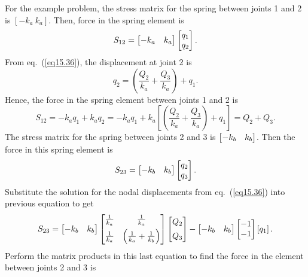 \documentclass{AeroStructure-ERJohnson}
\begin{document}
For the example problem, the stress matrix for the spring between joints 1 and 2 is $\left[-k_{a}\ k_{a}\right]$. Then, force in the spring element is
\[
S_{12}=\left[\begin{array}{@{}ll@{}}-k_{a} & k_{a}\end{array}\right]\left[\begin{array}{@{}l@{}}q_{1} \\q_{2}\end{array}\right].
\]
From eq.~(\ref{eq15.36}), the displacement at joint 2 is
\[
q_{2}=\left(\frac{Q_{2}}{k_{a}}+\frac{Q_{3}}{k_{a}}\right)+q_{1}.
\]
Hence, the force in the spring element between joints 1 and 2 is
\[
S_{12}=-k_{a} q_{1}+k_{a} q_{2}=-k_{a} q_{1}+k_{a}\left[\left(\frac{Q_{2}}{k_{a}}+\frac{Q_{3}}{k_{a}}\right)+q_{1}\right]=Q_{2}+Q_{3}.
\]
The stress matrix for the spring between joints 2 and 3 is $\left[\begin{array}{@{}ll@{}}-k_{b} & k_{b}\end{array}\right]$. Then the force in this spring element is
\[
S_{23}=\left[\begin{array}{@{}ll@{}}-k_{b} & k_{b}\end{array}\right]\left[\begin{array}{@{}l@{}}q_{2} \\q_{3}\end{array}\right].
\]
Substitute the solution for the nodal displacements from eq.~(\ref{eq15.36}) into previous equation to get
\[
S_{23}=\left[\begin{array}{@{}ll@{}}-k_{b} & k_{b}\end{array}\right]\left[\begin{array}{@{}cc@{}}\frac{1}{k_{a}} & \frac{1}{k_{a}} \\[5pt] \frac{1}{k_{a}} & \left(\frac{1}{k_{a}}+\frac{1}{k_{b}}\right)\end{array}\right]
\left[\begin{array}{@{}l@{}}Q_{2} \\[5pt]Q_{3}\end{array}\right]-\left[\begin{array}{@{}ll@{}}-k_{b} & k_{b}\end{array}\right]\left[\begin{array}{@{}l@{}}-1 \\-1\end{array}\right]\left[q_{1}\right].
\]
Perform the matrix products in this last equation to find the force in the element between joints 2 and 3 is
\end{document}
